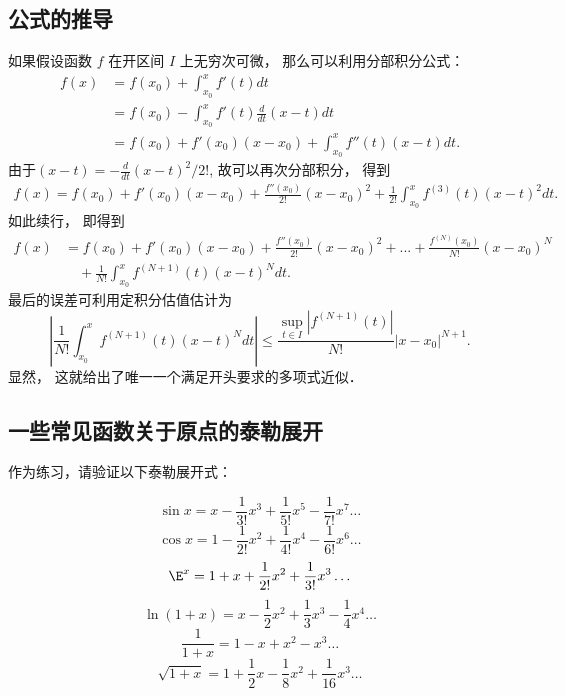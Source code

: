 \subsection{公式的推导}
如果假设函数 $f$ 在开区间 $I$ 上无穷次可微， 那么可以利用分部积分公式：
\begin{equation}
\begin{aligned}
f(x)
&=f(x_0)+\int_{x_0}^{x}f'(t)dt\\
&=f(x_0)-\int_{x_0}^{x}f'(t)\frac{d}{dt}(x-t)dt\\
&=f(x_0)+f'(x_0)(x-x_0)+\int_{x_0}^{x}f''(t)(x-t)dt.
\end{aligned}
\end{equation}
由于$(x-t)=-\frac{d}{dt}(x-t)^2/2!$, 故可以再次分部积分， 得到
\begin{equation}
\begin{aligned}
f(x)
=f(x_0)+f'(x_0)(x-x_0)+\frac{f''(x_0)}{2!}(x-x_0)^2
+\frac{1}{2!}\int_{x_0}^{x}f^{(3)}(t)(x-t)^2dt.
\end{aligned}
\end{equation}
如此续行， 即得到
\begin{equation}
\begin{aligned}
f(x)
&=f(x_0)+f'(x_0)(x-x_0)+\frac{f''(x_0)}{2!}(x-x_0)^2+...+\frac{f^{(N)}(x_0)}{N!}(x-x_0)^N\\
&\quad+\frac{1}{N!}\int_{x_0}^{x}f^{(N+1)}(t)(x-t)^{N}dt.
\end{aligned}
\end{equation}
最后的误差可利用定积分估值估计为
\begin{equation}\label{Taylor_eq7}
\left|\frac{1}{N!}\int_{x_0}^{x}f^{(N+1)}(t)(x-t)^{N}dt\right|
\leq\frac{\sup_{t\in I}|f^{(N+1)}(t)|}{N!}|x-x_0|^{N+1}.
\end{equation}
显然， 这就给出了唯一一个满足开头要求的多项式近似．

\subsection{一些常见函数关于原点的泰勒展开}
作为练习，请验证以下泰勒展开式：

\begin{equation}
\sin x = x - \frac{1}{3!} x^3 + \frac{1}{5!} x^5 - \frac{1}{7!} x^7 \ldots
\end{equation}
\begin{equation}
\cos x = 1 - \frac{1}{2!} x^2 + \frac{1}{4!} x^4 -\frac{1}{6!} x^6 \ldots
\end{equation}
\begin{equation}\label{Taylor_eq11}
\E^x =1 + x + \frac{1}{2!} x^2 + \frac{1}{3!} x^3  \ldots
\end{equation}
\begin{equation}
\ln (1+x) = x - \frac12 x^2 + \frac13 x^3 - \frac14 x^4 \ldots
\end{equation}
\begin{equation}
\frac{1}{1+x} = 1 - x + x^2 - x^3 \ldots
\end{equation}
\begin{equation}
\sqrt{1+x} = 1 + \frac12 x - \frac18 x^2 + \frac{1}{16} x^3 \ldots
\end{equation}

